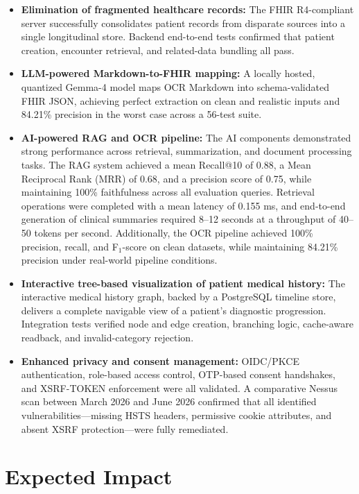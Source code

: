 \begin{itemize}

\item \textbf{Elimination of fragmented healthcare records:} The FHIR R4-compliant server successfully consolidates patient records from disparate sources into a single longitudinal store.
 Backend end-to-end tests confirmed that patient creation, encounter retrieval, and related-data bundling all pass.

\item \textbf{LLM-powered Markdown-to-FHIR mapping:} A locally hosted, quantized
Gemma-4 model maps OCR Markdown into schema-validated FHIR JSON, achieving perfect
extraction on clean and realistic inputs and 84.21\% precision in the worst case
across a 56-test suite.
\item \textbf{AI-powered RAG and OCR pipeline:} The AI components demonstrated strong performance across retrieval, summarization, and document processing tasks.
 The RAG system achieved a mean Recall@10 of 0.88,
  a Mean Reciprocal Rank (MRR) of 0.68,
   and a precision score of 0.75, while maintaining 100\% faithfulness across all evaluation queries.
    Retrieval operations were completed with a mean latency of 0.155 ms,
     and end-to-end generation of clinical summaries required 8--12 seconds at a throughput of 40--50 tokens per second.
      Additionally, the OCR pipeline achieved 100\% precision, recall, and F$_1$-score on clean datasets,
       while maintaining 84.21\% precision under real-world pipeline conditions.
\item \textbf{Interactive tree-based visualization of patient medical history:} The interactive medical history graph, backed by a PostgreSQL timeline store, delivers a complete navigable view of a patient's diagnostic progression.
 Integration tests verified node and edge creation, branching logic, cache-aware readback, and invalid-category rejection.

\item \textbf{Enhanced privacy and consent management:} OIDC/PKCE authentication, role-based access control, OTP-based consent handshakes, and XSRF-TOKEN enforcement were all validated.
 A comparative Nessus scan between March 2026 and June 2026 confirmed that all identified vulnerabilities---missing HSTS headers,
  permissive cookie attributes, and absent XSRF protection---were fully remediated.

\end{itemize}
\section{Expected Impact}

